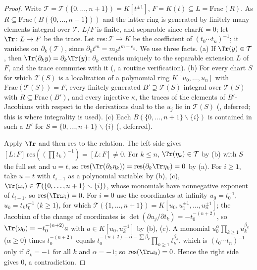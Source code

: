 \begin{proof}
Write $\mathcal T=\mathcal T(\{0,\dots,n+1\})=K[t^{\pm1}]$, $F=K(t)\subseteq L=\mathrm{Frac}(R)$. As $R\subseteq\mathrm{Frac}(B(\{0,
\dots,n+1\}))$ and the latter ring is generated by finitely many elements integral over $\mathcal T$, $L/F$ is finite, and separable
since $\mathrm{char}K=0$; let $\Tr\colon L\to F$ be the trace. Let $\mathrm{res}\colon\mathcal T\to K$ be the coefficient of
$(t_0\cdots t_n)^{-1}$; it vanishes on $\partial_k(\mathcal T)$, since $\partial_kt^m=m_kt^{m-e_k}$. We use three facts. (a) If
$\Tr(y)\in\mathcal T$, then $\Tr(\partial_ky)=\partial_k\Tr(y)$: $\partial_k$ extends uniquely to the separable extension $L$ of $F$,
and the trace commutes with it (, a routine verification). (b) For every
chart $S$ for which $\mathcal T(S)$ is a localization of a polynomial ring $K[u_0,\dots,u_n]$ with $\mathrm{Frac}(\mathcal T(S))=F$,
every finitely generated $B'\supseteq\mathcal T(S)$ integral over $\mathcal T(S)$ with $R\subseteq\mathrm{Frac}(B')$, and every
injective $\kappa$, the traces of the elements of $B'$-Jacobians with respect to the derivations dual to the $u_j$ lie in
$\mathcal T(S)$ (, deferred; this is where integrality is used).
(c) Each $B(\{0,\dots,n+1\}\smallsetminus\{i\})$ is contained in such a $B'$ for $S=\{0,\dots,n+1\}\smallsetminus\{i\}$
(, deferred).

Apply $\Tr$ and then $\mathrm{res}$ to the relation. The left side gives $[L:F]\,\mathrm{res}((\prod t_k)^{-1})=[L:F]\ne0$. For
$k\le n$, $\Tr(\eta_k)\in\mathcal T$ by (b) with $S$ the full set and $u=t$, so $\mathrm{res}(\Tr(\partial_k\eta_k))=
\mathrm{res}(\partial_k\Tr\eta_k)=0$ by (a). For $i\ge1$, take $u=t$ with $t_{i-1}$ as a polynomial variable: by (b), (c),
$\Tr(\omega_i)\in\mathcal T(\{0,\dots,n+1\}\smallsetminus\{i\})$, whose monomials have nonnegative exponent of $t_{i-1}$, so
$\mathrm{res}(\Tr\omega_i)=0$. For $i=0$ use the coordinates at infinity $u_0=t_0^{-1}$, $u_k=t_kt_0^{-1}$ ($k\ge1$), for which
$\mathcal T(\{1,\dots,n+1\})=K[u_0,u_1^{\pm1},\dots,u_n^{\pm1}]$; the Jacobian of the change of coordinates is
$\det(\partial u_j/\partial t_k)=-t_0^{-(n+2)}$, so $\Tr(\omega_0)=-t_0^{-(n+2)}a$ with $a\in K[u_0,u_k^{\pm1}]$ by (b), (c). A monomial
$u_0^\alpha\prod_{k\ge1}u_k^{\beta_k}$ ($\alpha\ge0$) times $t_0^{-(n+2)}$ equals $t_0^{-(n+2)-\alpha-\sum\beta_k}\prod_{k\ge1}t_k^{\beta_k}$, which is
$(t_0\cdots t_n)^{-1}$ only if $\beta_k=-1$ for all $k$ and $\alpha=-1$; so $\mathrm{res}(\Tr\omega_0)=0$. Hence the right side gives
$0$, a contradiction.
\end{proof}

